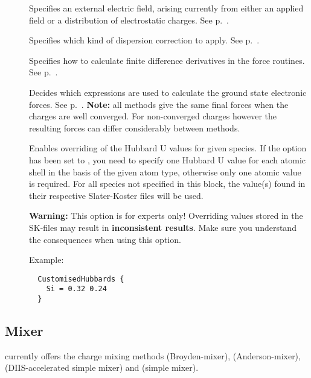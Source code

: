 \begin{description}
\item[] Specifies an external electric field,
  arising currently from either an applied field or a distribution of
  electrostatic charges. See p.~.

\item[] Specifies which kind of dispersion correction
  to apply. See p.~.

\item[] Specifies how to calculate finite difference
  derivatives in the force routines. See p.~.

\item[] Decides which expressions are used to calculate the ground state
  electronic forces.  See p.~. \textbf{Note:} all methods give the same final
  forces when the charges are well converged. For non-converged charges however the resulting forces
  can differ considerably between methods.

\item[] Enables overriding of the Hubbard U values for given species. If the
  option  has been set to , you need to specify one Hubbard U value
  for each atomic shell in the basis of the given atom type, otherwise only one atomic value is
  required. For all species not specified in this block, the value(s) found in their respective
  Slater-Koster files will be used.

  \textbf{Warning:} This option is for experts only! Overriding values stored in the SK-files may
  result in \textbf{inconsistent results}. Make sure you understand the consequences when using this
  option.

  Example:
  \begin{verbatim}
  CustomisedHubbards {
    Si = 0.32 0.24
  }
  \end{verbatim}

\end{description}


\subsection{Mixer}
\label{sec:dftbp.Mixer}

{\dftbp} currently offers the charge mixing methods 
(Broyden-mixer),  (Anderson-mixer), 
(DIIS-accelerated simple mixer) and  (simple mixer).

